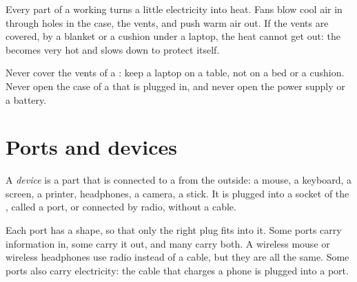 Every part of a working  turns a little electricity into heat. Fans
blow cool air in through holes in the case, the vents, and push warm air out.
If the vents are covered, by a blanket or a cushion under a laptop, the heat
cannot get out: the  becomes very hot and slows down to protect itself.

\begin{safety}
Never cover the vents of a : keep a laptop on a table, not on a bed or
a cushion. Never open the case of a  that is plugged in, and never
open the power supply or a battery.
\end{safety}

\section{Ports and devices}

\begin{definition}[Device]\label{def:g3:inside-the-computer:device}
A \emph{device} is a part that is connected to a
 from the outside: a mouse, a keyboard, a screen, a printer,
headphones, a camera, a  stick. It is plugged into a socket of the
, called a port, or connected by radio, without a cable.
\end{definition}

Each port has a shape, so that only the right plug fits into it. Some ports
carry information in, some carry it out, and many carry both. A wireless mouse
or wireless headphones use radio instead of a cable, but they are  all
the same. Some ports also carry electricity: the cable that charges a phone is
plugged into a port.

